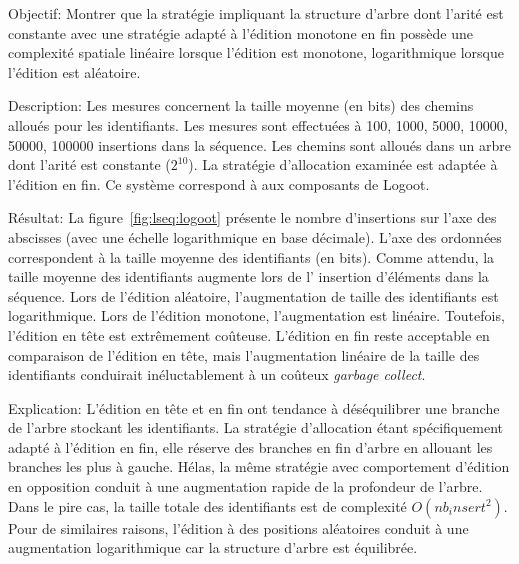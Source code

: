 \begin{asparadesc}
\item [Objectif:] Montrer que la stratégie impliquant la structure d'arbre dont
  l'arité est constante avec une stratégie adapté à l'édition monotone en fin
  possède une complexité spatiale linéaire lorsque l'édition est monotone,
  logarithmique lorsque l'édition est aléatoire.
\item [Description:] Les mesures concernent la taille moyenne (en bits) des
  chemins alloués pour les identifiants. Les mesures sont effectuées à 100,
  1000, 5000, 10000, 50000, 100000 insertions dans la séquence. Les chemins sont
  alloués dans un arbre dont l'arité est constante ($2^{10}$). La stratégie
  d'allocation examinée est adaptée à l'édition en fin. Ce système correspond à
  aux composants de Logoot.
\item [Résultat:] La figure~\ref{fig:lseq:logoot} présente le nombre d'insertions sur
  l'axe des abscisses (avec une échelle logarithmique en base décimale). L'axe
  des ordonnées correspondent à la taille moyenne des identifiants (en
  bits). Comme attendu, la taille moyenne des identifiants augmente lors de l'
  insertion d'éléments dans la séquence. Lors de l'édition aléatoire,
  l'augmentation de taille des identifiants est logarithmique. Lors de l'édition
  monotone, l'augmentation est linéaire. Toutefois, l'édition en tête est
  extrêmement coûteuse. L'édition en fin reste acceptable en comparaison de
  l'édition en tête, mais l'augmentation linéaire de la taille des identifiants 
  conduirait inéluctablement à un coûteux \emph{garbage collect}.
\item [Explication:] L'édition en tête et en fin ont tendance à déséquilibrer
  une branche de l'arbre stockant les identifiants. La stratégie d'allocation
  étant spécifiquement adapté à l'édition en fin, elle réserve des branches en
  fin d'arbre en allouant les branches les plus à gauche. Hélas, la même
  stratégie avec comportement d'édition en opposition conduit à une augmentation
  rapide de la profondeur de l'arbre. Dans le pire cas, la taille totale des
  identifiants est de complexité $O(nb_insert^2)$. Pour de similaires raisons,
  l'édition à des positions aléatoires conduit à une augmentation logarithmique
  car la structure d'arbre est équilibrée.
\end{asparadesc}

\ \\

